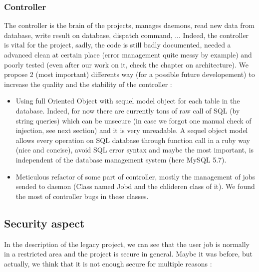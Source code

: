 \documentclass{eplmastersthesis}
\begin{document}
        \subsubsection{Controller}
          
          The controller is the brain of the projects, manages daemons, read new data from database, 
          write result on database, dispatch command, ... Indeed, the controller is vital for the project, 
          sadly, the code is still badly documented, needed a advanced clean at certain place (error management quite messy by example) 
          and poorly tested (even after our work on it, check the chapter on architecture). We propose
          2 (most important) differents way (for a possible future developement) to increase the quality and the stability of the controller :

          \begin{itemize}
            \item Using full Oriented Object with sequel \cite{Sequel} model object for each table in the database. 
            Indeed, for now there are currently tons of raw call of SQL (by string queries) which can be unsecure (in case
            we forgot one manual check of injection, see next section) and it is very unreadable. A sequel object model allows 
            every operation on SQL database through function call in a ruby way (nice and concise), avoid SQL error syntax and 
            maybe the most important, is independent of the database management system (here MySQL 5.7).
            \item Meticulous refactor of some part of controller, mostly the management of jobs sended to daemon 
            (Class named Jobd and the chlideren class of it). We found the most of controller bugs in these classes.
          \end{itemize}

      \subsection{Security aspect}
      
        In the description of the legacy project, we can see that the user job is normally in a restricted area and the project 
        is secure in general. Maybe it was before, but actually, we think that it is not enough secure for multiple reasons : 
\end{document}
